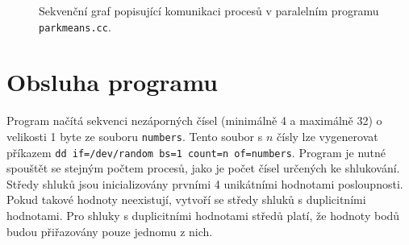 \documentclass[a4paper, 11pt, fleqn]{scrartcl}
\begin{document}
    \newpage

    \begin{figure}[!ht]
      \centering
      \caption{Sekvenční graf popisující komunikaci procesů v paralelním programu \texttt{parkmeans.cc}.}
    \end{figure}



  \section{Obsluha programu}
    Program načítá sekvenci nezáporných čísel (minimálně 4 a maximálně 32) o velikosti 1 byte ze souboru \texttt{numbers}. Tento soubor s $n$ čísly lze vygenerovat příkazem \texttt{dd if=/dev/random bs=1 count=n of=numbers}. Program je nutné spouštět se stejným počtem procesů, jako je počet čísel určených ke shlukování. Středy shluků jsou inicializovány prvními 4 unikátními hodnotami posloupnosti. Pokud takové hodnoty neexistují, vytvoří se středy shluků s duplicitními hodnotami. Pro shluky s duplicitními hodnotami středů platí, že hodnoty bodů budou přiřazovány pouze jednomu z nich.
\end{document}
